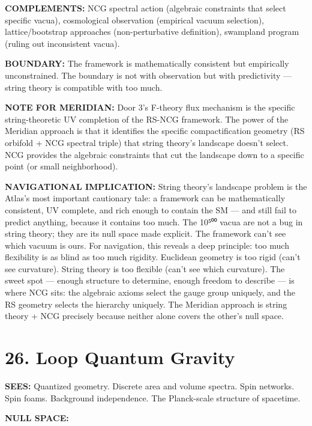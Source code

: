 \textbf{COMPLEMENTS:} NCG spectral action (algebraic constraints that select specific vacua), cosmological observation (empirical vacuum selection), lattice/bootstrap approaches (non-perturbative definition), swampland program (ruling out inconsistent vacua).


\textbf{BOUNDARY:} The framework is mathematically consistent but empirically unconstrained. The boundary is not with observation but with predictivity — string theory is compatible with too much.


\textbf{NOTE FOR MERIDIAN:} Door 3's F-theory flux mechanism is the specific string-theoretic UV completion of the RS-NCG framework. The power of the Meridian approach is that it identifies the specific compactification geometry (RS orbifold + NCG spectral triple) that string theory's landscape doesn't select. NCG provides the algebraic constraints that cut the landscape down to a specific point (or small neighborhood).


\textbf{NAVIGATIONAL IMPLICATION:} String theory's landscape problem is the Atlas's most important cautionary tale: a framework can be mathematically consistent, UV complete, and rich enough to contain the SM — and still fail to predict anything, because it contains too much. The 10⁵⁰⁰ vacua are not a bug in string theory; they are its null space made explicit. The framework can't see which vacuum is ours. For navigation, this reveals a deep principle: too much flexibility is as blind as too much rigidity. Euclidean geometry is too rigid (can't see curvature). String theory is too flexible (can't see which curvature). The sweet spot — enough structure to determine, enough freedom to describe — is where NCG sits: the algebraic axioms select the gauge group uniquely, and the RS geometry selects the hierarchy uniquely. The Meridian approach is string theory + NCG precisely because neither alone covers the other's null space.


\bigskip\noindent\makebox[\textwidth]{\color{rulegray}\rule{5cm}{0.3pt}}\bigskip


\section*{26. Loop Quantum Gravity}


\textbf{SEES:} Quantized geometry. Discrete area and volume spectra. Spin networks. Spin foams. Background independence. The Planck-scale structure of spacetime.


\textbf{NULL SPACE:}

